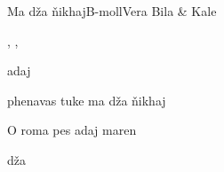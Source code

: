 \begin{song}{Ma dža ňikhaj}{B-moll}{}{Vera Bila \& Kale}{}{}

  \begin{SBVerse}

       

    , ,  

  \end{SBVerse}
  \begin{SBChorus}

      adaj  

    phenavas tuke ma dža ňikhaj

    O roma pes adaj maren

      dža 

  \end{SBChorus}

\end{song}
